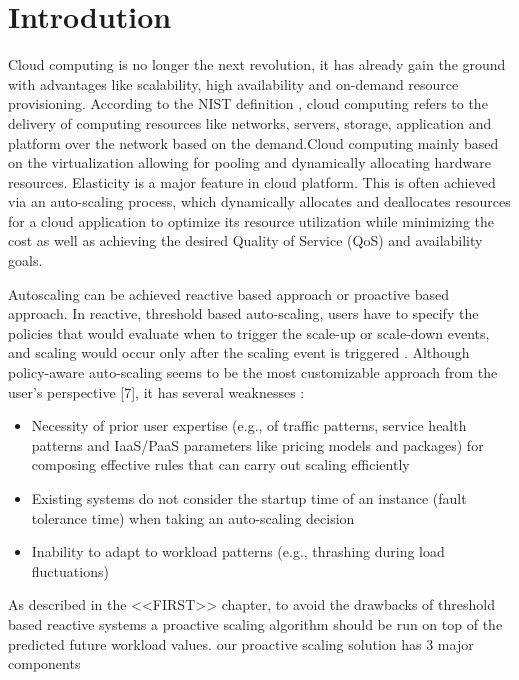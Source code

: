 \section{Introdution}

Cloud computing is no longer the next revolution, it has already gain the ground with advantages like scalability, high availability and on-demand resource provisioning. According to the NIST definition \cite{Mell_2011} , cloud computing refers to the delivery of computing resources like networks, servers, storage, application and platform over the network based on the demand.Cloud computing mainly based on the virtualization allowing for pooling and dynamically allocating hardware resources. Elasticity is a major feature in cloud platform. This is often achieved via an auto-scaling process, which dynamically allocates and deallocates resources for a cloud application to optimize its resource utilization while minimizing the cost as well as achieving the desired Quality of Service (QoS) and availability goals\cite{Roy_2011}\cite{Armbrust_2010}.

Autoscaling can be achieved  reactive based approach or proactive based approach. In reactive, threshold based auto-scaling, users have to specify the policies that would evaluate when to trigger the scale-up or scale-down events, and scaling would occur only after the scaling event is triggered \cite{Lorido_Botran_2014} .
Although policy-aware auto-scaling seems to be the most customizable approach from the user’s perspective [7], it has several weaknesses \cite{Alipour:2014:AAI:2735522.2735532} :

\begin{itemize}
\item Necessity of prior user expertise (e.g., of traffic patterns, service health patterns and IaaS/PaaS parameters like pricing models and packages) for composing effective rules that can carry out scaling efficiently
\item Existing systems do not consider the startup time of an instance (fault tolerance time) when taking an auto-scaling decision
\item Inability to adapt to workload patterns (e.g., thrashing during load fluctuations)
\end{itemize}


As described in the <<FIRST>> chapter, to avoid the drawbacks of threshold based reactive systems a proactive scaling algorithm should be run on top of the predicted future workload values. our proactive scaling solution has 3 major components


